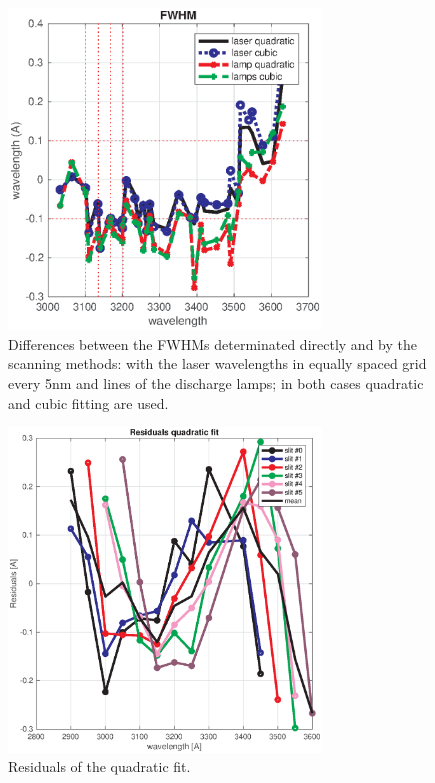 \documentclass[acp, manuscript]{copernicus}
\begin{document}
\begin{figure}[t]
\includegraphics[width=8.3cm]{figures/General_fwhm_comparison.eps}
\caption{Differences between the FWHMs determinated directly and by the scanning methods: with the laser wavelengths in equally spaced grid every 5nm and lines of the discharge lamps; in both cases quadratic and cubic fitting are used.}
\label{fig:fwhm_comp}
\end{figure}



\begin{figure}[t]
\includegraphics[width=8.3cm]{figures/General_DSP_QUAD_RES.eps}
\caption{ Residuals of the quadratic fit.}
\label{fig:dsp_residual_quad}
\end{figure}
\end{document}
